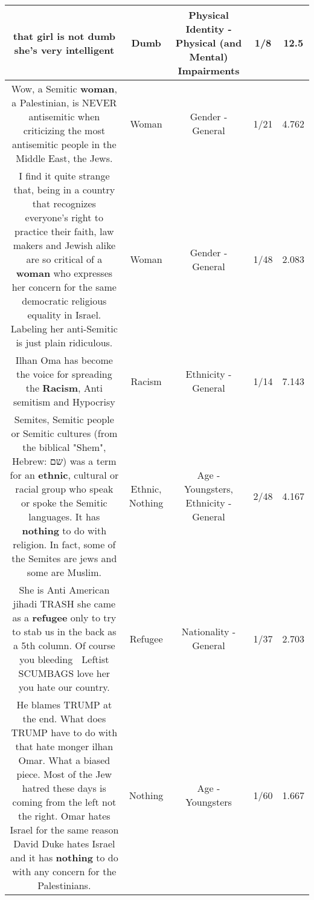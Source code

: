 \documentclass[11pt]{article}
\newlength\mylength
\begin{document}
\begin{center}
\begin{longtable}{|C{.65\mylength}|C{.30\mylength}|C{.12\mylength}|C{.12\mylength}|C{.12\mylength}|}
  \small that girl is not \textbf{dumb} she's very intelligent\normalsize   & Dumb & Physical Identity - Physical (and Mental) Impairments & 1/8 & 12.5 \\  \hline
  \small Wow, a Semitic \textbf{woman}, a Palestinian, is NEVER antisemitic when criticizing the most antisemitic people in the Middle East, the Jews.\normalsize   & Woman & Gender - General & 1/21 & 4.762 \\  \hline
  \small I find it quite strange that, being in a country that recognizes everyone's right to practice their faith,  law makers and Jewish alike are so critical of a \textbf{woman} who expresses her concern for the same democratic religious equality in Israel. Labeling her anti-Semitic is just plain ridiculous.\normalsize   & Woman & Gender - General & 1/48 & 2.083 \\  \hline
  \small Ilhan Oma has become the  voice  for spreading  the \textbf{Racism},  Anti  semitism  and  Hypocrisy\normalsize   & Racism & Ethnicity - General & 1/14 & 7.143 \\  \hline
  \small Semites, Semitic people or Semitic cultures (from the biblical "Shem", Hebrew: שם) was a term for an \textbf{ethnic}, cultural or racial group who speak or spoke the Semitic languages. It has \textbf{nothing} to do with religion. In fact, some of the Semites are jews and some are Muslim.\normalsize   & Ethnic, Nothing & Age - Youngsters, Ethnicity - General & 2/48 & 4.167 \\  \hline
  \small She is Anti American jihadi TRASH she came as a \textbf{refugee} only to try to stab us in the back as a 5th column. Of course you bleeding 💓 Leftist SCUMBAGS love her you hate our country.\normalsize   & Refugee & Nationality - General & 1/37 & 2.703 \\  \hline
  \small He blames TRUMP at the end. What does TRUMP  have to do with that hate monger ilhan Omar. What a biased piece. Most of the Jew hatred these days is coming from the left not the right. Omar hates Israel for the same reason David Duke hates Israel and it has \textbf{nothing} to do with any concern for the Palestinians.\normalsize   & Nothing & Age - Youngsters & 1/60 & 1.667 \\  \hline

\end{longtable}
\end{center}
\end{document}
